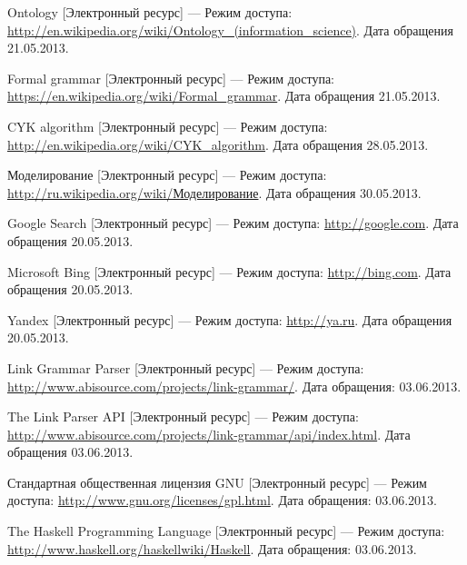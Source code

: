 \begin{thebibliography}{99}
	Ontology [Электронный ресурс] --- Режим доступа: \url{http://en.wikipedia.org/wiki/Ontology_(information_science)}. Дата обращения 21.05.2013. 

	Formal grammar [Электронный ресурс] --- Режим доступа: \url{https://en.wikipedia.org/wiki/Formal_grammar}. Дата обращения 21.05.2013.

	CYK algorithm [Электронный ресурс] --- Режим доступа: \url{http://en.wikipedia.org/wiki/CYK_algorithm}. Дата обращения 28.05.2013.

	Моделирование [Электронный ресурс] --- Режим доступа: \url{http://ru.wikipedia.org/wiki/Моделирование}. Дата обращения 30.05.2013.

	Google Search [Электронный ресурс] --- Режим доступа: \url{http://google.com}. Дата обращения 20.05.2013.

	Microsoft Bing [Электронный ресурс] --- Режим доступа: \url{http://bing.com}. Дата обращения 20.05.2013.

	Yandex [Электронный ресурс] --- Режим доступа: \url{http://ya.ru}. Дата обращения 20.05.2013.

	Link Grammar Parser [Электронный ресурс] --- Режим доступа: \url{http://www.abisource.com/projects/link-grammar/}. Дата обращения: 03.06.2013.

	The Link Parser API [Электронный ресурс] --- Режим доступа: \url{http://www.abisource.com/projects/link-grammar/api/index.html}. Дата обращения 03.06.2013.

	Стандартная общественная лицензия GNU [Электронный ресурс] --- Режим доступа: \url{http://www.gnu.org/licenses/gpl.html}. Дата обращения: 03.06.2013.

	The Haskell Programming Language [Электронный ресурс] --- Режим доступа: \url{http://www.haskell.org/haskellwiki/Haskell}. Дата обращения: 03.06.2013.
\end{thebibliography}